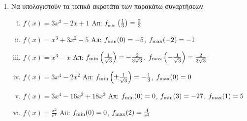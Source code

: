 


\everymath{\displaystyle}



\begin{center}
  \minibox{\large\bfseries  \textcolor{Col1}{Ασκήσεις στα Ακρότατα}}
\end{center}

\thispagestyle{empty}
\vspace{\baselineskip}

\begin{enumerate}
    \item Να υπολογιστούν τα τοπικά ακροτάτα των παρακάτω συναρτήσεων.

        \begin{enumerate}[i)]
        \renewcommand{\itemsep}{15pt}
            \item $ f(x) = 3x^{2}-2x+1 $ 
                \hfill Απ: $ f_{\rm_{min}}\left(\frac{1}{3} \right) = \frac{2}{3} $ 
            \item $ f(x) = x^{3}+3x^{2}-5 $ 
                \hfill Απ: $ f_{\rm min}(0) = -5 $, $ f_{\rm max}(-2) = -1 $ 
            \item $ f(x) = x^{3} - x $ 
                \hfill Απ: $ f_{\rm min}\left(\frac{1}{\sqrt{3}} \right) 
                = - \frac{2}{3 \sqrt{3}} $, $ f_{\rm max} \left(-\frac{1}{\sqrt{3}} 
                \right) = \frac{2}{3 \sqrt{3}} $
            \item $ f(x) = 3x^{4} - 2x^{2} $ 
                \hfill Απ: $ f_{\rm min}\left(\pm \frac{1}{\sqrt{3}}\right) 
                = - \frac{1}{3} $, $ f_{\rm max}(0) = 0 $
            \item $ f(x) = 3x^{4} -16x^{3}+18x^{2} $ 
                \hfill Απ: $ f_{\rm min}(0)=0 $, $ f_{\rm min}(3)
                =-27 $, $ f_{\rm max}(1) = 5 $ 
            \item $ f(x) = \frac{x^{2}}{e^{x}} $
                 \hfill Απ: $ f_{\rm min}(0) = 0 $, $f_{\rm max}(2) = \frac{4}{e^{2}} $ 
        \end{enumerate}

\end{enumerate}




